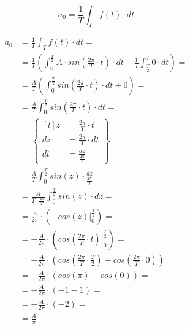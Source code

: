 \begin{task}

\begin{equation}
a_0=\frac{1}{T}\int_{T}f(t) \cdot dt
\end{equation}


\begin{align*}
a_0&=\frac{1}{T}\int_{T}f(t) \cdot dt=\\
&=\frac{1}{T}\left(\int_{0}^{\frac{T}{2}}A \cdot sin\left( \frac{2\pi}{T} \cdot t\right) \cdot dt 
+ \frac{1}{T}\int_{\frac{T}{2}}^{T}0 \cdot dt \right)=\\
&=\frac{A}{T}\left(\int_{0}^{\frac{T}{2}}sin\left( \frac{2\pi}{T} \cdot t\right) \cdot dt 
+ 0 \right)=\\
&=\frac{A}{T}\int_{0}^{\frac{T}{2}}sin\left( \frac{2\pi}{T} \cdot t\right) \cdot dt=\\
&=\begin{Bmatrix*}[l]
z&=\frac{2\pi}{T} \cdot t\\
dz&=\frac{2\pi}{T} \cdot dt\\
dt&=\frac{dz}{\frac{2\pi}{T}}
\end{Bmatrix*}=\\
&=\frac{A}{T}\int_{0}^{\frac{T}{2}}sin\left( z\right) \cdot \frac{dz}{\frac{2\pi}{T}}=\\
&=\frac{A}{T\cdot \frac{2\pi}{T}}\int_{0}^{\frac{T}{2}}sin\left( z\right) \cdot dz=\\
&=\frac{A}{2\pi}\cdot \left(\left . -cos\left( z\right) \right|_{0}^{\frac{T}{2}}\right)=\\
&=-\frac{A}{2\pi}\cdot \left(\left . cos\left( \frac{2\pi}{T} \cdot t\right) \right|_{0}^{\frac{T}{2}}\right)=\\
&=-\frac{A}{2\pi}\cdot \left( cos\left( \frac{2\pi}{T} \cdot \frac{T}{2}\right) - cos\left( \frac{2\pi}{T} \cdot 0\right)\right)=\\
&=-\frac{A}{2\pi}\cdot \left( cos\left( \pi\right) - cos\left( 0\right)\right)=\\
&=-\frac{A}{2\pi}\cdot \left( -1 - 1\right)=\\
&=-\frac{A}{2\pi}\cdot \left( -2\right)=\\
&=\frac{A}{\pi}
\end{align*}



\end{task}
